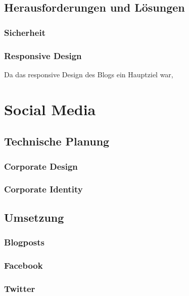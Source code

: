 {  \subsection{Herausforderungen und Lösungen}

    \subsubsection{Sicherheit}

    \subsubsection{Responsive Design}
    Da das responsive Design des Blogs ein Hauptziel war,
\section{Social Media}

  \subsection{Technische Planung}

    \subsubsection{Corporate Design}

    \subsubsection{Corporate Identity}

  \subsection{Umsetzung}

    \subsubsection{Blogposts}

    \subsubsection{Facebook}

    \subsubsection{Twitter}

}
